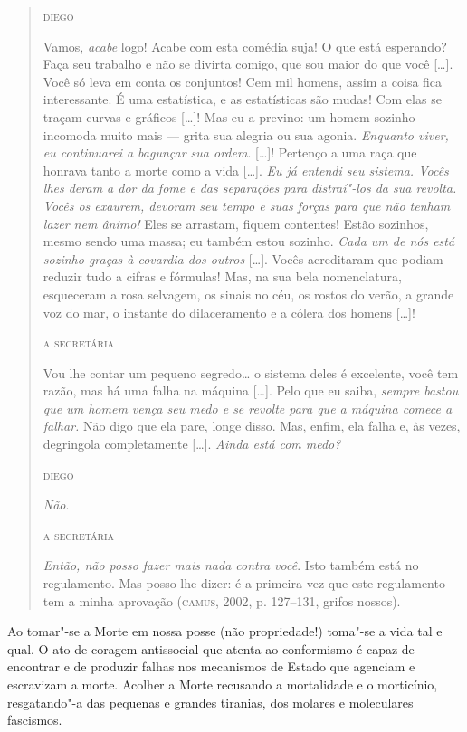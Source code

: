 \begin{quote}
\textsc{diego}

Vamos, \textit{acabe} logo! Acabe com esta comédia suja! O que está
esperando? Faça seu trabalho e não se divirta comigo, que sou maior do
que você {[}\ldots{}{]}. Você só leva em conta os conjuntos! Cem mil homens,
assim a coisa fica interessante. É uma estatística, e as estatísticas
são mudas! Com elas se traçam curvas e gráficos {[}\ldots{}{]}! Mas eu a
previno: um homem sozinho incomoda muito mais --- grita sua alegria ou
sua agonia. \textit{Enquanto viver, eu continuarei a bagunçar sua
ordem}. {[}\ldots{}{]}! Pertenço a uma raça que honrava tanto a morte como a
vida {[}\ldots{}{]}. \textit{Eu já entendi seu sistema. Vocês lhes deram a
dor da fome e das separações para distraí"-los da sua revolta. Vocês os
exaurem, devoram seu tempo e suas forças para que não tenham lazer nem
ânimo!} Eles se arrastam, fiquem contentes! Estão sozinhos, mesmo sendo
uma massa; eu também estou sozinho. \textit{Cada um de nós está sozinho
graças à covardia dos outros} {[}\ldots{}{]}. Vocês acreditaram que podiam
reduzir tudo a cifras e fórmulas! Mas, na sua bela nomenclatura,
esqueceram a rosa selvagem, os sinais no céu, os rostos do verão, a
grande voz do mar, o instante do dilaceramento e a cólera dos homens
{[}\ldots{}{]}!

\textsc{a secretária}

Vou lhe contar um pequeno segredo\ldots{} o sistema deles é excelente, você
tem razão, mas há uma falha na máquina {[}\ldots{}{]}. Pelo que eu saiba,
\textit{sempre bastou que um homem vença seu medo e se revolte para que
a máquina comece a falhar.} Não digo que ela pare, longe disso. Mas,
enfim, ela falha e, às vezes, degringola completamente {[}\ldots{}{]}.
\textit{Ainda está com medo?}

\textsc{diego}

\textit{Não}.

\textsc{a secretária}

\textit{Então, não posso fazer mais nada contra você}. Isto também está
no regulamento. Mas posso lhe dizer: é a primeira vez que este
regulamento tem a minha aprovação (\textsc{camus}, 2002, p. 127--131, grifos
nossos).
\end{quote}

Ao tomar"-se a Morte em nossa posse (não propriedade!) toma"-se a vida tal
e qual. O ato de coragem antissocial que atenta ao conformismo é capaz
de encontrar e de produzir falhas nos mecanismos de Estado que agenciam
e escravizam a morte. Acolher a Morte recusando a mortalidade e o
morticínio, resgatando"-a das pequenas e grandes tiranias, dos molares e
moleculares fascismos.

